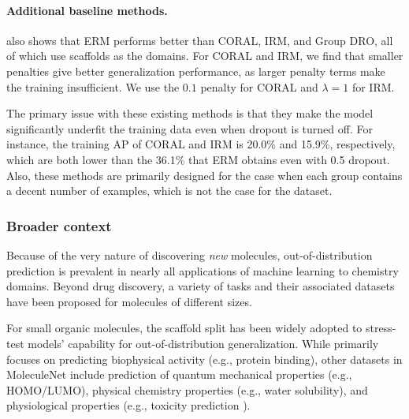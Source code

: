 \paragraph{Additional baseline methods.}
 also shows that ERM performs better than CORAL, IRM, and Group DRO, all of which use scaffolds as the domains. For CORAL and IRM, we find that smaller penalties give better generalization performance, as larger penalty terms make the training insufficient.
We use the $0.1$ penalty for CORAL and $\lambda=1$ for IRM.

The primary issue with these existing methods is that they make the model significantly underfit the training data even when dropout is turned off.
For instance, the training AP of CORAL and IRM is 20.0\% and 15.9\%, respectively, which are both lower than the 36.1\% that ERM obtains even with 0.5 dropout.
Also, these methods are primarily designed for the case when each group contains a decent number of examples, which is not the case for the \Mol dataset.

\subsubsection{Broader context}
Because of the very nature of discovering \emph{new} molecules, out-of-distribution prediction is prevalent in nearly all applications of machine learning to chemistry domains. Beyond drug discovery, a variety of tasks and their associated datasets have been proposed for molecules of different sizes.

For small organic molecules, the scaffold split has been widely adopted to stress-test models' capability for out-of-distribution generalization. While \Mol primarily focuses on predicting biophysical activity (e.g., protein binding), other datasets in  MoleculeNet \citep{wu2018moleculenet} include prediction of quantum mechanical properties (e.g., HOMO/LUMO), physical chemistry properties (e.g., water solubility), and physiological properties (e.g., toxicity prediction \citep{attene2013tox21}).

